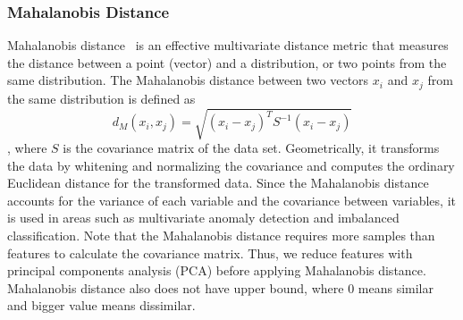 \subsubsection{Mahalanobis Distance}
Mahalanobis distance~\cite{Mah} is an effective multivariate distance metric that measures the distance between a point (vector) and a distribution, or two points from the same distribution. 
The Mahalanobis distance between two vectors $x_i$ and $x_j$ from the same distribution is defined as
\begin{equation}d_{M}(x_i, x_j)=\sqrt{(x_i-x_j)^{T} S^{-1}(x_i-x_j)}
\end{equation}, where $S$ is the covariance matrix of the data set. Geometrically, it transforms the data by whitening and normalizing the covariance and computes the ordinary Euclidean distance for the transformed data. Since the Mahalanobis distance accounts for the variance of each variable and the covariance between variables, it is used in areas such as multivariate anomaly detection and imbalanced classification. Note that the Mahalanobis distance requires more samples than features to calculate the covariance matrix. Thus, we reduce features with principal components analysis (PCA) before applying Mahalanobis distance. Mahalanobis distance also does not have upper bound, where 0 means similar and bigger value means dissimilar.

